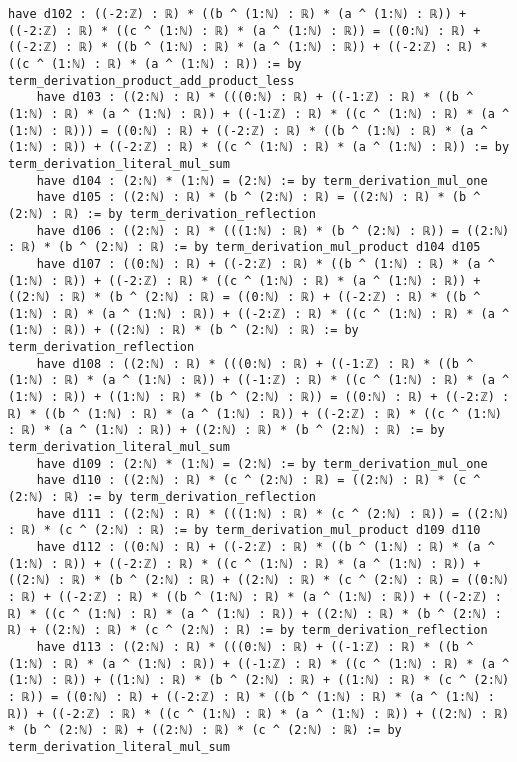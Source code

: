 \documentclass{article}
\begin{document}
\begin{tcolorbox}[colback=white!10, width=\linewidth]
\begin{lstlisting}[language=Lean4]
    have d102 : ((-2:ℤ) : ℝ) * ((b ^ (1:ℕ) : ℝ) * (a ^ (1:ℕ) : ℝ)) + ((-2:ℤ) : ℝ) * ((c ^ (1:ℕ) : ℝ) * (a ^ (1:ℕ) : ℝ)) = ((0:ℕ) : ℝ) + ((-2:ℤ) : ℝ) * ((b ^ (1:ℕ) : ℝ) * (a ^ (1:ℕ) : ℝ)) + ((-2:ℤ) : ℝ) * ((c ^ (1:ℕ) : ℝ) * (a ^ (1:ℕ) : ℝ)) := by term_derivation_product_add_product_less
    have d103 : ((2:ℕ) : ℝ) * (((0:ℕ) : ℝ) + ((-1:ℤ) : ℝ) * ((b ^ (1:ℕ) : ℝ) * (a ^ (1:ℕ) : ℝ)) + ((-1:ℤ) : ℝ) * ((c ^ (1:ℕ) : ℝ) * (a ^ (1:ℕ) : ℝ))) = ((0:ℕ) : ℝ) + ((-2:ℤ) : ℝ) * ((b ^ (1:ℕ) : ℝ) * (a ^ (1:ℕ) : ℝ)) + ((-2:ℤ) : ℝ) * ((c ^ (1:ℕ) : ℝ) * (a ^ (1:ℕ) : ℝ)) := by term_derivation_literal_mul_sum
    have d104 : (2:ℕ) * (1:ℕ) = (2:ℕ) := by term_derivation_mul_one
    have d105 : ((2:ℕ) : ℝ) * (b ^ (2:ℕ) : ℝ) = ((2:ℕ) : ℝ) * (b ^ (2:ℕ) : ℝ) := by term_derivation_reflection
    have d106 : ((2:ℕ) : ℝ) * (((1:ℕ) : ℝ) * (b ^ (2:ℕ) : ℝ)) = ((2:ℕ) : ℝ) * (b ^ (2:ℕ) : ℝ) := by term_derivation_mul_product d104 d105
    have d107 : ((0:ℕ) : ℝ) + ((-2:ℤ) : ℝ) * ((b ^ (1:ℕ) : ℝ) * (a ^ (1:ℕ) : ℝ)) + ((-2:ℤ) : ℝ) * ((c ^ (1:ℕ) : ℝ) * (a ^ (1:ℕ) : ℝ)) + ((2:ℕ) : ℝ) * (b ^ (2:ℕ) : ℝ) = ((0:ℕ) : ℝ) + ((-2:ℤ) : ℝ) * ((b ^ (1:ℕ) : ℝ) * (a ^ (1:ℕ) : ℝ)) + ((-2:ℤ) : ℝ) * ((c ^ (1:ℕ) : ℝ) * (a ^ (1:ℕ) : ℝ)) + ((2:ℕ) : ℝ) * (b ^ (2:ℕ) : ℝ) := by term_derivation_reflection
    have d108 : ((2:ℕ) : ℝ) * (((0:ℕ) : ℝ) + ((-1:ℤ) : ℝ) * ((b ^ (1:ℕ) : ℝ) * (a ^ (1:ℕ) : ℝ)) + ((-1:ℤ) : ℝ) * ((c ^ (1:ℕ) : ℝ) * (a ^ (1:ℕ) : ℝ)) + ((1:ℕ) : ℝ) * (b ^ (2:ℕ) : ℝ)) = ((0:ℕ) : ℝ) + ((-2:ℤ) : ℝ) * ((b ^ (1:ℕ) : ℝ) * (a ^ (1:ℕ) : ℝ)) + ((-2:ℤ) : ℝ) * ((c ^ (1:ℕ) : ℝ) * (a ^ (1:ℕ) : ℝ)) + ((2:ℕ) : ℝ) * (b ^ (2:ℕ) : ℝ) := by term_derivation_literal_mul_sum
    have d109 : (2:ℕ) * (1:ℕ) = (2:ℕ) := by term_derivation_mul_one
    have d110 : ((2:ℕ) : ℝ) * (c ^ (2:ℕ) : ℝ) = ((2:ℕ) : ℝ) * (c ^ (2:ℕ) : ℝ) := by term_derivation_reflection
    have d111 : ((2:ℕ) : ℝ) * (((1:ℕ) : ℝ) * (c ^ (2:ℕ) : ℝ)) = ((2:ℕ) : ℝ) * (c ^ (2:ℕ) : ℝ) := by term_derivation_mul_product d109 d110
    have d112 : ((0:ℕ) : ℝ) + ((-2:ℤ) : ℝ) * ((b ^ (1:ℕ) : ℝ) * (a ^ (1:ℕ) : ℝ)) + ((-2:ℤ) : ℝ) * ((c ^ (1:ℕ) : ℝ) * (a ^ (1:ℕ) : ℝ)) + ((2:ℕ) : ℝ) * (b ^ (2:ℕ) : ℝ) + ((2:ℕ) : ℝ) * (c ^ (2:ℕ) : ℝ) = ((0:ℕ) : ℝ) + ((-2:ℤ) : ℝ) * ((b ^ (1:ℕ) : ℝ) * (a ^ (1:ℕ) : ℝ)) + ((-2:ℤ) : ℝ) * ((c ^ (1:ℕ) : ℝ) * (a ^ (1:ℕ) : ℝ)) + ((2:ℕ) : ℝ) * (b ^ (2:ℕ) : ℝ) + ((2:ℕ) : ℝ) * (c ^ (2:ℕ) : ℝ) := by term_derivation_reflection
    have d113 : ((2:ℕ) : ℝ) * (((0:ℕ) : ℝ) + ((-1:ℤ) : ℝ) * ((b ^ (1:ℕ) : ℝ) * (a ^ (1:ℕ) : ℝ)) + ((-1:ℤ) : ℝ) * ((c ^ (1:ℕ) : ℝ) * (a ^ (1:ℕ) : ℝ)) + ((1:ℕ) : ℝ) * (b ^ (2:ℕ) : ℝ) + ((1:ℕ) : ℝ) * (c ^ (2:ℕ) : ℝ)) = ((0:ℕ) : ℝ) + ((-2:ℤ) : ℝ) * ((b ^ (1:ℕ) : ℝ) * (a ^ (1:ℕ) : ℝ)) + ((-2:ℤ) : ℝ) * ((c ^ (1:ℕ) : ℝ) * (a ^ (1:ℕ) : ℝ)) + ((2:ℕ) : ℝ) * (b ^ (2:ℕ) : ℝ) + ((2:ℕ) : ℝ) * (c ^ (2:ℕ) : ℝ) := by term_derivation_literal_mul_sum

\end{lstlisting}
\end{tcolorbox}
\end{document}
